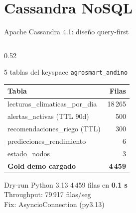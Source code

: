 \documentclass[14pt,aspectratio=169]{beamer}
\begin{document}
\section{Cassandra NoSQL}

\begin{frame}{Apache Cassandra 4.1: dise\~no query-first}
  \begin{columns}[T]
    \begin{column}{0.52\textwidth}
      \begin{block}{5 tablas del keyspace \texttt{agrosmart\_andino}}
        \footnotesize
        \begin{tabular}{p{4.2cm}r}
          Tabla & Filas \\
          \hline
          lecturas\_climaticas\_por\_dia & 18\,265 \\
          alertas\_activas (TTL 90d) & 500 \\
          recomendaciones\_riego (TTL) & 300 \\
          predicciones\_rendimiento & 6 \\
          estado\_nodos & 3 \\
          \hline
          \textbf{Gold demo cargado} & \textbf{4\,459} \\
        \end{tabular}
      \end{block}
      \vspace{0.3em}
      \begin{alertblock}{Dry-run Python 3.13}
        \footnotesize
        4\,459 filas en \textbf{0.1 s}\\
        Throughput: 79\,917 filas/seg\\
        Fix: AsyncioConnection (py3.13)
      \end{alertblock}
    \end{column}


\end{columns}
\end{frame}
\end{document}
